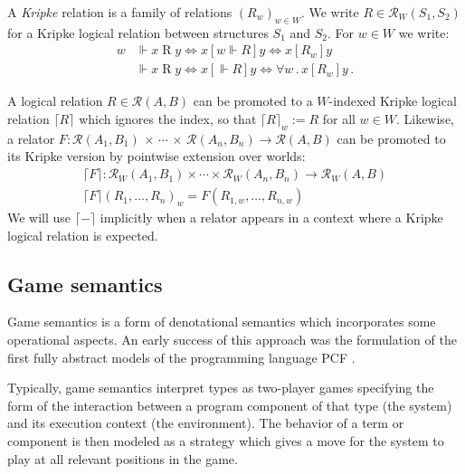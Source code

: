\documentclass[sigplan,10pt,review,anonymous]{acmart}\settopmatter{printfolios=true,printccs=false,printacmref=false}
\newcommand{\ifr}[1]{\mathrel{[{#1}]}}
\begin{document}
\begin{definition} \label{def:klr} %
A \emph{Kripke} relation is
a family of relations $(R_w)_{w \in W}$.
We write $R \in \mathcal{R}_W(S_1, S_2)$
for a Kripke logical relation between structures $S_1$ and $S_2$.
For $w \in W$ we write:
\begin{align*}
    w &\Vdash x \mathrel{R} y \Leftrightarrow
      x \ifr{w \Vdash R} y \Leftrightarrow
      x \ifr{R_w} y \\
    &\Vdash x \mathrel{R} y \Leftrightarrow
      x \ifr{\Vdash R} y \Leftrightarrow
      \forall w \,.\, x \ifr{R_w} y \,.
\end{align*}
\end{definition}

A logical relation $R \in \mathcal{R}(A, B)$
can be promoted to a $W$-indexed Kripke logical relation $\lceil R \rceil$
which ignores the index, so that $\lceil R \rceil_w := R$ for all $w \in W$.
Likewise,
a relator
  $F : \mathcal{R}(A_1, B_1) \,\times\,\cdots\,\times\,\mathcal{R}(A_n, B_n) \rightarrow \mathcal{R}(A, B)$
can be promoted to its Kripke version
by pointwise extension over worlds:
\begin{gather*}
  \lceil F \rceil : \mathcal{R}_W(A_1, B_1) \times \cdots \times \mathcal{R}_W(A_n, B_n) \rightarrow \mathcal{R}_W(A, B) \\
  \lceil F \rceil (R_1, \ldots, R_n)_w = F(R_{1,w}, \ldots, R_{n,w})
\end{gather*}
We will use $\lceil - \rceil$ implicitly
when a relator appears in a context where
a Kripke logical relation is expected.


\subsection{Game semantics} \label{sec:gamesem} %


Game semantics is a form of denotational semantics which
incorporates some operational aspects.
An early success of this approach was
the formulation of the first fully abstract models
of the programming language PCF \cite{pcfajm,pcfho}.

Typically,
game semantics interpret
types as two-player games
specifying the form of the interaction
between a program component of that type
(the system)
and its execution context
(the environment).
The behavior of a term or component
is then modeled as a strategy
which gives a move for the system to play
at all relevant positions in the game.
\end{document}
